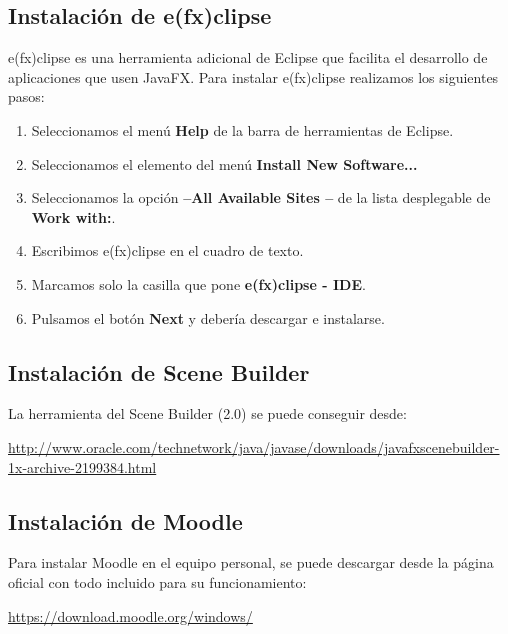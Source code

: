 \subsection{Instalación de e(fx)clipse}

e(fx)clipse es una herramienta adicional de Eclipse que facilita el desarrollo de aplicaciones que usen JavaFX. 
Para instalar e(fx)clipse realizamos los siguientes pasos:

\begin{enumerate}
	\item Seleccionamos el menú \textbf{Help} de la barra de herramientas de Eclipse.
	\item Seleccionamos el elemento del menú \textbf{Install New Software...}
	
	
	\item Seleccionamos la opción \textbf{--All Available Sites --} de la lista desplegable de \textbf{Work with:}.
	\item Escribimos e(fx)clipse en el cuadro de texto.
	\item Marcamos solo la casilla que pone \textbf{e(fx)clipse - IDE}.
	\item Pulsamos el botón \textbf{Next} y debería descargar e instalarse.
\end{enumerate}


\subsection{Instalación de Scene Builder}

La herramienta del Scene Builder (2.0) se puede conseguir desde: 

\href{http://www.oracle.com/technetwork/java/javase/downloads/javafxscenebuilder-1x-archive-2199384.html}{http://www.oracle.com/technetwork/java/javase/downloads/javafxscenebuilder-1x-archive-2199384.html}

\subsection{Instalación de Moodle}

Para instalar Moodle en el equipo personal, se puede descargar desde la página oficial con todo incluido para su funcionamiento:

\href{https://download.moodle.org/windows/}{https://download.moodle.org/windows/}

